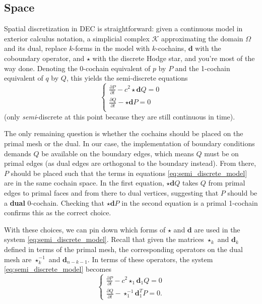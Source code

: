 \documentclass[utf8,english]{gradu3}
\begin{document}
\subsection{Space}

Spatial discretization in DEC is straightforward:
given a continuous model in exterior calculus notation,
a simplicial complex $\mathcal{K}$ approximating the domain $\Omega$ and its dual,
replace $k$-forms in the model with $k$-cochains,
$\mathbf{d}$ with the coboundary operator,
and $\star$ with the discrete Hodge star,
and you're most of the way done.
Denoting the 0-cochain equivalent of $p$ by $P$
and the 1-cochain equivalent of $q$ by $Q$,
this yields the semi-discrete equations
\begin{equation}\label{eq:semi_discrete_model}
  \begin{cases}
    \frac{\partial P}{\partial t} - c^2 \star \mathbf{d} Q = 0 \\
    \frac{\partial Q}{\partial t} - \star \mathbf{d} P = 0 \\
  \end{cases}
\end{equation}
(only \textit{semi}-discrete at this point
because they are still continuous in time).

The only remaining question is whether the cochains should be placed
on the primal mesh or the dual.
In our case, the implementation of boundary conditions demands $Q$
be available on the boundary edges, which means $Q$ must be on primal edges
(as dual edges are orthogonal to the boundary instead).
From there, $P$ should be placed such that the terms in equations \eqref{eq:semi_discrete_model}
are in the same cochain space.
In the first equation, $\star\mathbf{d}Q$
takes $Q$ from primal edges to primal faces and from there to dual vertices,
suggesting that $P$ should be a \textbf{dual} 0-cochain.
Checking that $\star \mathbf{d} P$ in the second equation
is a primal 1-cochain confirms this as the correct choice.

With these choices, we can pin down which forms of $\star$ and $\mathbf{d}$
are used in the system \eqref{eq:semi_discrete_model}.
Recall that given the matrices $\star_k$ and $\mathbf{d}_k$
defined in terms of the primal mesh,
the corresponding operators on the dual mesh are
$\star_k^{-1}$ and $\mathbf{d}_{n-k-1}$.
In terms of these operators, the system \eqref{eq:semi_discrete_model} becomes
\begin{equation}\label{eq:semi_discrete_model_annotated}
  \begin{cases}
    \frac{\partial P}{\partial t} - c^2 \star_1 \mathbf{d}_1 Q = 0 \\
    \frac{\partial Q}{\partial t} - \star_1^{-1} \mathbf{d}_1^T P = 0.
  \end{cases}
\end{equation}
\end{document}
